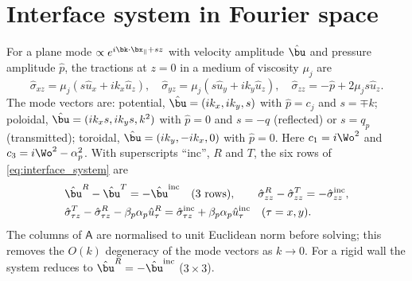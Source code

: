 \section{Interface system in Fourier space}\label{app:interface}
For a plane mode $\propto e^{i\bk\cdot\bx_\parallel+sz}$ with velocity amplitude $\hat\bu$ and pressure amplitude
$\hat p$, the tractions at $z=0$ in a medium of viscosity $\mu_j$ are
\begin{equation*}
  \hat\sigma_{xz}=\mu_j\left(s\hat u_x+ik_x\hat u_z\right),\quad
  \hat\sigma_{yz}=\mu_j\left(s\hat u_y+ik_y\hat u_z\right),\quad
  \hat\sigma_{zz}=-\hat p+2\mu_js\hat u_z .
\end{equation*}
The mode vectors are: potential, $\hat\bu=(ik_x,ik_y,s)$ with $\hat p=c_j$ and $s=\mp k$; poloidal,
$\hat\bu=(ik_xs,ik_ys,k^2)$ with $\hat p=0$ and $s=-q$ (reflected) or $s=q_p$ (transmitted); toroidal,
$\hat\bu=(ik_y,-ik_x,0)$ with $\hat p=0$. Here $c_1=i\Wo^2$ and $c_3=i\Wo^2-\alpha_p^2$. With superscripts
``inc'', $R$ and $T$, the six rows of \cref{eq:interface_system} are
\begin{align*}
  &\hat\bu^{R}-\hat\bu^{T}=-\hat\bu^{\rm inc}\quad(3\ \text{rows}),\qquad
  \hat\sigma^{R}_{zz}-\hat\sigma^{T}_{zz}=-\hat\sigma^{\rm inc}_{zz},\\
  &\hat\sigma^{T}_{\tau z}-\hat\sigma^{R}_{\tau z}-\beta_p\alpha_p\hat u^{R}_\tau
   =\hat\sigma^{\rm inc}_{\tau z}+\beta_p\alpha_p\hat u^{\rm inc}_\tau\quad(\tau=x,y).
\end{align*}
The columns of $\mathsf A$ are normalised to unit Euclidean norm before solving; this removes the $O(k)$ degeneracy of
the mode vectors as $k\to0$. For a rigid wall the system reduces to $\hat\bu^R=-\hat\bu^{\rm inc}$ ($3\times3$).
